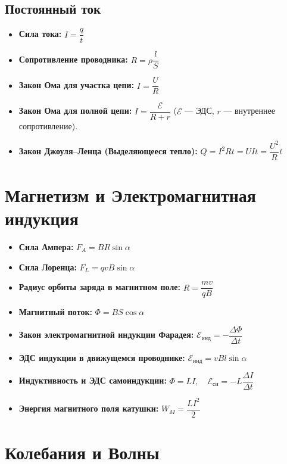 \documentclass[11pt, a4paper]{article}
\begin{document}
\subsection{Постоянный ток}
\begin{itemize}
    \item \textbf{Сила тока:} $I = \dfrac{q}{t}$
    \item \textbf{Сопротивление проводника:} $R = \rho \dfrac{l}{S}$
    \item \textbf{Закон Ома для участка цепи:} $I = \dfrac{U}{R}$
    \item \textbf{Закон Ома для полной цепи:} $I = \dfrac{\mathcal{E}}{R + r}$ \quad ($\mathcal{E}$ --- ЭДС, $r$ --- внутреннее сопротивление).
    \item \textbf{Закон Джоуля--Ленца (Выделяющееся тепло):} $Q = I^2 R t = U I t = \dfrac{U^2}{R} t$
\end{itemize}

\section{Магнетизм и Электромагнитная индукция}

\begin{itemize}
    \item \textbf{Сила Ампера:} $F_A = B I l \sin\alpha$
    \item \textbf{Сила Лоренца:} $F_L = q v B \sin\alpha$
    \item \textbf{Радиус орбиты заряда в магнитном поле:} $R = \dfrac{m v}{q B}$
    \item \textbf{Магнитный поток:} $\Phi = B S \cos\alpha$
    \item \textbf{Закон электромагнитной индукции Фарадея:} $\mathcal{E}_{\text{инд}} = -\dfrac{\Delta\Phi}{\Delta t}$
    \item \textbf{ЭДС индукции в движущемся проводнике:} $\mathcal{E}_{\text{инд}} = v B l \sin\alpha$
    \item \textbf{Индуктивность и ЭДС самоиндукции:} $\Phi = L I, \quad \mathcal{E}_{\text{си}} = -L \dfrac{\Delta I}{\Delta t}$
    \item \textbf{Энергия магнитного поля катушки:} $W_M = \dfrac{L I^2}{2}$
\end{itemize}

\section{Колебания и Волны}
\end{document}
